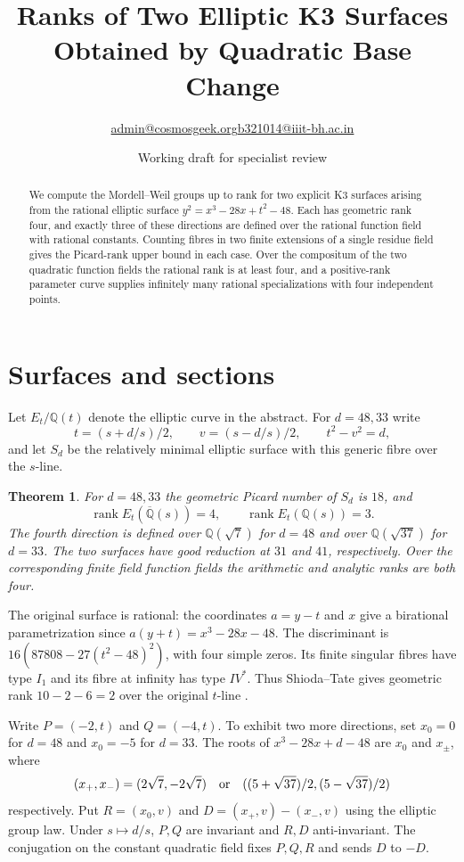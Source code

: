\documentclass[11pt]{article}
\title{Ranks of Two Elliptic K3 Surfaces Obtained by Quadratic Base Change}
\author{\small \href{mailto:admin@cosmosgeek.org}{admin@cosmosgeek.org}\qquad \href{mailto:b321014@iiit-bh.ac.in}{b321014@iiit-bh.ac.in}}
\date{Working draft for specialist review}
\newtheorem{theorem}{Theorem}
\newcommand{\Q}{\mathbb Q}
\begin{document}
\maketitle
\begin{abstract}
We compute the Mordell--Weil groups up to rank for two explicit K3 surfaces
arising from the rational elliptic surface $y^2=x^3-28x+t^2-48$.
Each has geometric rank four, and exactly three of these directions are
defined over the rational function field with rational constants.
Counting fibres in two finite extensions of a single residue field
gives the Picard-rank upper bound in each case. Over the compositum of
the two quadratic function fields the rational rank is at least four,
and a positive-rank parameter curve supplies infinitely many rational
specializations with four independent points.
\end{abstract}

\section{Surfaces and sections}
Let $E_t/\Q(t)$ denote the elliptic curve in the abstract. For
$d=48,33$ write
\[
 t=(s+d/s)/2,\qquad v=(s-d/s)/2,\qquad t^2-v^2=d,
\]
and let $S_d$ be the relatively minimal elliptic surface with this
generic fibre over the $s$-line.

\begin{theorem}
For $d=48,33$ the geometric Picard number of $S_d$ is $18$, and
\[
 \operatorname{rank} E_t(\overline{\Q}(s))=4,\qquad
 \operatorname{rank} E_t(\Q(s))=3 .
\]
The fourth direction is defined over $\Q(\sqrt7)$ for $d=48$ and
over $\Q(\sqrt{37})$ for $d=33$. The two surfaces have good
reduction at $31$ and $41$, respectively. Over the corresponding
finite field function fields the arithmetic and analytic ranks
are both four.
\end{theorem}

The original surface is rational: the coordinates $a=y-t$ and $x$
give a birational parametrization since $a(y+t)=x^3-28x-48$.
The discriminant is $16(87808-27(t^2-48)^2)$, with four simple
zeros. Its finite singular fibres have type $I_1$ and its fibre at
infinity has type $IV^*$. Thus Shioda--Tate gives geometric rank
$10-2-6=2$ over the original $t$-line \cite{SS}.

Write $P=(-2,t)$ and $Q=(-4,t)$. To exhibit two more directions,
set $x_0=0$ for $d=48$ and $x_0=-5$ for $d=33$. The roots
of $x^3-28x+d-48$ are $x_0$ and $x_\pm$, where
\[
 (x_+,x_-)=(2\sqrt7,-2\sqrt7)
 \quad\hbox{or}\quad ((5+\sqrt{37})/2,(5-\sqrt{37})/2)
\]
respectively. Put $R=(x_0,v)$ and $D=(x_+,v)-(x_-,v)$ using the
elliptic group law. Under $s\mapsto d/s$, $P,Q$ are invariant
and $R,D$ anti-invariant. The conjugation on the constant quadratic
field fixes $P,Q,R$ and sends $D$ to $-D$.
\end{document}
